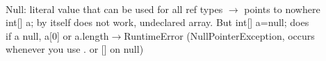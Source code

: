 ~\\ \color{Tan}
Null: literal value that can be used for all ref types $\rightarrow$ points to nowhere
\\ int[] a; by itself does not work, undeclared array. But int[] a=null; does
\\ if a null, a[0] or a.length$\rightarrow$RuntimeError (NullPointerException, occurs whenever you use . or [] on null)